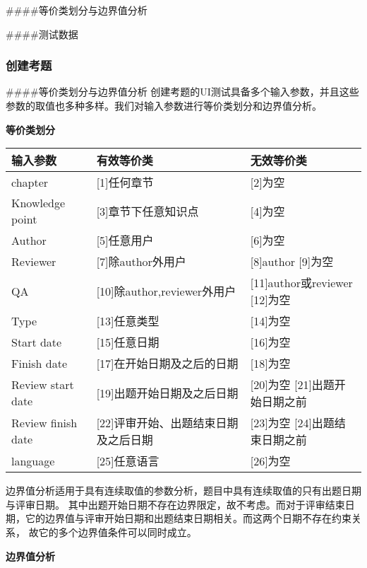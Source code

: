 \documentclass[hyperref, a4paper]{ctexart}
\begin{document}
\#\#\#\#等价类划分与边界值分析

\#\#\#\#测试数据

\hypertarget{ux521bux5efaux8003ux9898-1}{%
\subsubsection{创建考题}\label{ux521bux5efaux8003ux9898-1}}

\#\#\#\#等价类划分与边界值分析
创建考题的UI测试具备多个输入参数，并且这些参数的取值也多种多样。我们对输入参数进行等价类划分和边界值分析。

\textbf{等价类划分}

\begin{longtable}[]{@{}lll@{}}
\toprule
输入参数 & 有效等价类 & 无效等价类\tabularnewline
\midrule
\endhead
chapter & {[}1{]}任何章节 & {[}2{]}为空\tabularnewline
Knowledge point & {[}3{]}章节下任意知识点 & {[}4{]}为空\tabularnewline
Author & {[}5{]}任意用户 & {[}6{]}为空\tabularnewline
Reviewer & {[}7{]}除author外用户 & {[}8{]}author
{[}9{]}为空\tabularnewline
QA & {[}10{]}除author,reviewer外用户 & {[}11{]}author或reviewer
{[}12{]}为空\tabularnewline
Type & {[}13{]}任意类型 & {[}14{]}为空\tabularnewline
Start date & {[}15{]}任意日期 & {[}16{]}为空\tabularnewline
Finish date & {[}17{]}在开始日期及之后的日期 &
{[}18{]}为空\tabularnewline
Review start date & {[}19{]}出题开始日期及之后日期 & {[}20{]}为空
{[}21{]}出题开始日期之前\tabularnewline
Review finish date & {[}22{]}评审开始、出题结束日期及之后日期 &
{[}23{]}为空 {[}24{]}出题结束日期之前\tabularnewline
language & {[}25{]}任意语言 & {[}26{]}为空\tabularnewline
\bottomrule
\end{longtable}

边界值分析适用于具有连续取值的参数分析，题目中具有连续取值的只有出题日期与评审日期。
其中出题开始日期不存在边界限定，故不考虑。而对于评审结束日期，它的边界值与评审开始日期和出题结束日期相关。而这两个日期不存在约束关系，
故它的多个边界值条件可以同时成立。

\textbf{边界值分析}
\end{document}
